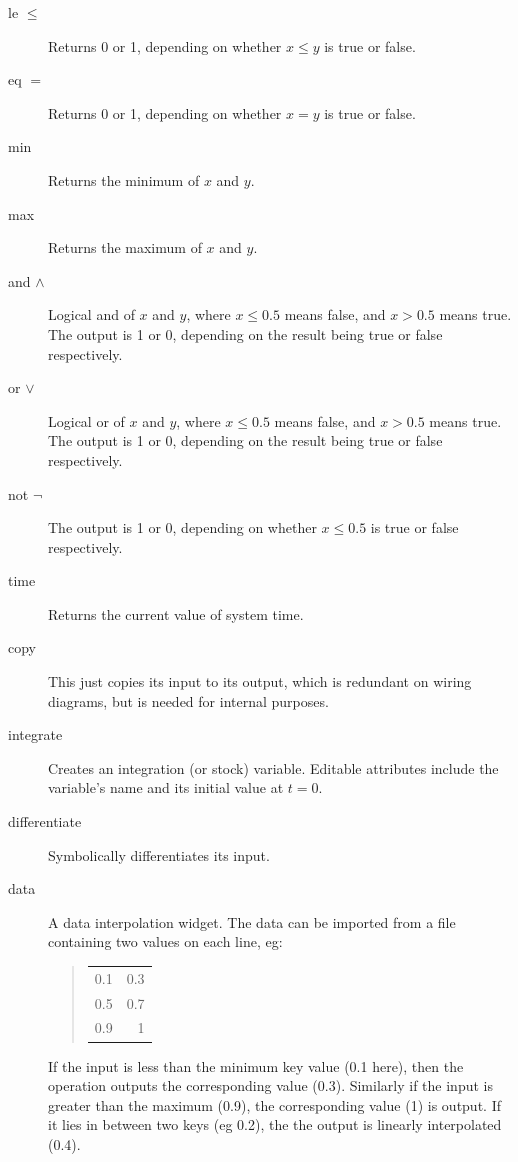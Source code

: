 \begin{description}
\item[le $\le$]\label{Operation:le} Returns 0 or 1, depending
  on whether $x\le y$ is true or false.

\item[eq $=$]\label{Operation:eq} Returns 0 or 1, depending
  on whether $x=y$ is true or false.

\item[min]\label{Operation:min} Returns the minimum of $x$ and $y$.

\item[max]\label{Operation:max} Returns the maximum of $x$ and $y$.

\item[and $\wedge$]\label{Operation:and_} Logical and of $x$ and $y$, where
  $x\le 0.5$
  means false, and $x>0.5$ means true. The output is 1 or 0, depending
  on the result being true or false respectively.

\item[or $\vee$]\label{Operation:or_} Logical or of $x$ and $y$, where $x\le0.5$
  means false, and $x>0.5$ means true. The output is 1 or 0, depending
  on the result being true or false respectively.

\item[not $\neg$]\label{Operation:not_} The output is 1 or 0, depending
  on whether $x\le0.5$ is true or false respectively.

\item[time ]\label{Operation:time} Returns the current value of system time.

\item[copy]\label{Operation:copy} This just copies its input to its output,
which is redundant on wiring diagrams, but is needed for internal
purposes.

\item[integrate ]\label{Operation:integrate} Creates an integration (or stock)
variable. Editable attributes include the variable's name and its
initial value at $t=0$.

\item[differentiate ]\label{Operation:differentiate} Symbolically differentiates its input.

\item[data ]\label{Operation:data} A data interpolation
widget. The data can be imported from a file containing
two values on each line, eg:
\begin{quote}
\begin{tabular}{rr}
0.1 &0.3\\
0.5 &0.7\\
0.9 &1\\
\end{tabular}
\end{quote}
If the input is less than the minimum key value (0.1 here), then the
operation outputs the corresponding value (0.3). Similarly if the
input is greater than the maximum (0.9), the corresponding value (1)
is output. If it lies in between two keys (eg 0.2), the the output is
linearly interpolated (0.4).


\end{description}
